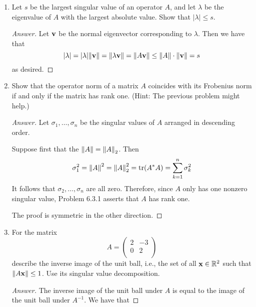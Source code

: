 \documentclass[../psets.tex]{subfiles}
\begin{document}
\begin{enumerate}[label={\textbf{3.\arabic*.}}]
\begin{proof}[Answer]
    \end{proof}
    \item Let $s$ be the largest singular value of an operator $A$, and let $\lambda$ be the eigenvalue of $A$ with the largest absolute value. Show that $|\lambda|\leq s$.
    \begin{proof}[Answer]
        Let $\mathbf{v}$ be the normal eigenvector corresponding to $\lambda$. Then we have that
        \begin{equation*}
            |\lambda| = |\lambda|\norm{\mathbf{v}}
            = \norm{\lambda\mathbf{v}}
            = \norm{A\mathbf{v}}
            \leq \norm{A}\cdot\norm{\mathbf{v}}
            = s
        \end{equation*}
        as desired.
    \end{proof}
    \item Show that the operator norm of a matrix $A$ coincides with its Frobenius norm if and only if the matrix has rank one. (Hint: The previous problem might help.)
    \begin{proof}[Answer]
        Let $\sigma_1,\dots,\sigma_n$ be the singular values of $A$ arranged in descending order.\par
        Suppose first that the $\norm{A}=\norm{A}_2$. Then
        \begin{equation*}
            \sigma_1^2 = \norm{A}^2
            = \norm{A}_2^2
            = \trace(A^*A)
            = \sum_{k=1}^n\sigma_k^2
        \end{equation*}
        It follows that $\sigma_2,\dots,\sigma_n$ are all zero. Therefore, since $A$ only has one nonzero singular value, Problem 6.3.1 asserts that $A$ has rank one.\par
        The proof is symmetric in the other direction.
    \end{proof}
    \item For the matrix
    \begin{equation*}
        A =
        \begin{pmatrix}
            2 & -3\\
            0 & 2\\
        \end{pmatrix}
    \end{equation*}
    describe the inverse image of the unit ball, i.e., the set of all $\mathbf{x}\in\mathbb{R}^2$ such that $\norm{A\mathbf{x}}\leq 1$. Use its singular value decomposition.
    \begin{proof}[Answer]
        The inverse image of the unit ball under $A$ is equal to the image of the unit ball under $A^{-1}$. We have that

\end{proof}
\end{enumerate}
\end{document}
